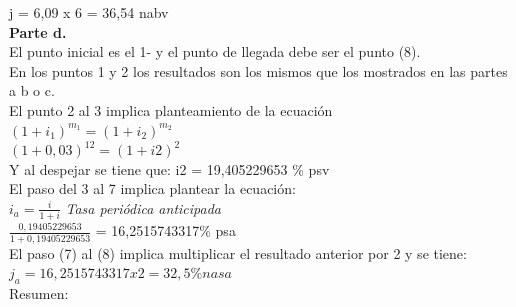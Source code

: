 j = 6,09 x 6 = 36,54 nabv\\

\textbf{Parte d.}\\

El punto inicial es el 1- y el punto de llegada debe ser el punto (8).\\ 
En los puntos 1 y 2 los resultados son los mismos que los mostrados en las partes a b o c.\\
El punto 2 al 3 implica planteamiento de la ecuación\\ 

$(1+i_{1})^{m_{1}} =(1+i_{2})^{m_{2}}$\\
$(1+0,03)^{12} = (1+ i2)^2$\\

Y al despejar se tiene que: i2 = 19,405229653 \% psv \\ 
El paso del 3 al 7 implica plantear la ecuación:\\ 

$i_{a} = \frac{i}{1+i}$ \hspace{35 pt} \textit{Tasa periódica anticipada}\\

$\frac{0,19405229653}{1+0,19405229653}$ = 16,2515743317\% psa\\

El paso (7) al (8) implica multiplicar el resultado anterior por 2 y se tiene:\\

$j_{a} = 16,2515743317 x 2 = 32,5\% nasa$\\

Resumen:\\

